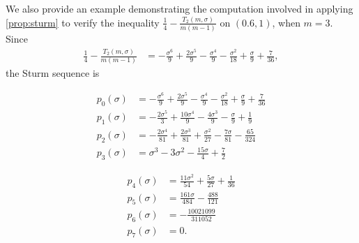 \documentclass{article}
\theoremstyle{plain}
\theoremstyle{definition}
\theoremstyle{remark}
\begin{document}
We also provide an example demonstrating the computation involved in applying \cref{prop:sturm} to verify the inequality $\frac{1}{4}-\frac{T_2(m,\sigma)}{m(m-1)}$ on $(0.6, 1)$, when $m=3$.
Since 
\begin{align*}
    \frac{1}{4}-\frac{T_2(m,\sigma)}{m(m-1)} &= - \frac{\sigma^6}{9} + \frac{2 \sigma^5}{9} - \frac{\sigma^4}{9} - \frac{\sigma^2}{18} + \frac{\sigma}{9} + \frac{7}{36},
\end{align*}
the Sturm sequence is 

\begin{minipage}{0.495\textwidth}
    \centering
    \begin{align*}
        p_0(\sigma) &= - \frac{\sigma^6}{9} + \frac{2 \sigma^5}{9} - \frac{\sigma^4}{9} - \frac{\sigma^2}{18} + \frac{\sigma}{9} + \frac{7}{36} \\
        p_1(\sigma) &= - \frac{2 \sigma^5}{3} + \frac{10 \sigma^4}{9} - \frac{4 \sigma^3}{9} - \frac{\sigma}{9} + \frac{1}{9} \\
        p_2(\sigma) &= - \frac{2 \sigma^4}{81} + \frac{2 \sigma^3}{81} + \frac{\sigma^2}{27} - \frac{7 \sigma}{81} - \frac{65}{324} \\
        p_3(\sigma) &= \sigma^3 - 3 \sigma^2 - \frac{15 \sigma}{4} + \frac{7}{2}
    \end{align*}
\end{minipage}
\begin{minipage}{0.495\textwidth}
    \centering
    \begin{align*}
        p_4(\sigma) &= \frac{11 \sigma^2}{54} + \frac{5 \sigma}{27} + \frac{1}{36} \\
        p_5(\sigma) &= \frac{161 \sigma}{484} - \frac{488}{121} \\
        p_6(\sigma) &= - \frac{10021099}{311052} \\
        p_7(\sigma) &= 0.
    \end{align*}
\end{minipage}
\end{document}
